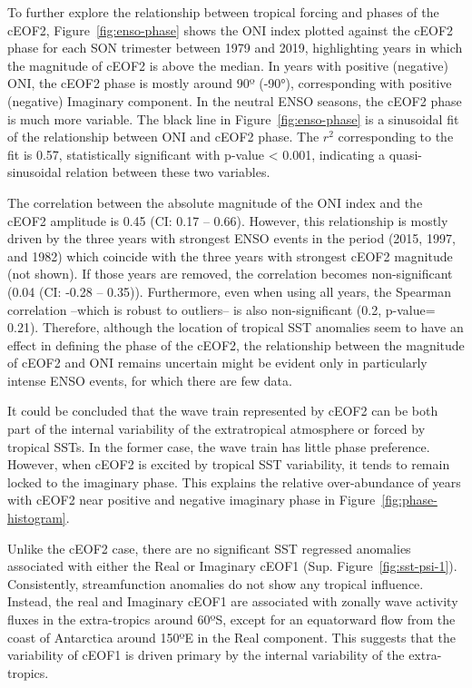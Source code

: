 \documentclass[smallextended]{svjour3}       %
\begin{document}
To further explore the relationship between tropical forcing and phases of the cEOF2, Figure~\ref{fig:enso-phase} shows the ONI index plotted against the cEOF2 phase for each SON trimester between 1979 and 2019, highlighting years in which the magnitude of cEOF2 is above the median.
In years with positive (negative) ONI, the cEOF2 phase is mostly around 90º (-90°), corresponding with positive (negative) Imaginary component.
In the neutral ENSO seasons, the cEOF2 phase is much more variable.
The black line in Figure~\ref{fig:enso-phase} is a sinusoidal fit of the relationship between ONI and cEOF2 phase.
The \(r^2\) corresponding to the fit is 0.57, statistically significant with p-value \textless{} 0.001, indicating a quasi-sinusoidal relation between these two variables.

The correlation between the absolute magnitude of the ONI index and the cEOF2 amplitude is 0.45 (CI: 0.17 -- 0.66).
However, this relationship is mostly driven by the three years with strongest ENSO events in the period (2015, 1997, and 1982) which coincide with the three years with strongest cEOF2 magnitude (not shown).
If those years are removed, the correlation becomes non-significant (0.04 (CI: -0.28 -- 0.35)).
Furthermore, even when using all years, the Spearman correlation --which is robust to outliers-- is also non-significant (0.2, p-value= 0.21).
Therefore, although the location of tropical SST anomalies seem to have an effect in defining the phase of the cEOF2, the relationship between the magnitude of cEOF2 and ONI remains uncertain might be evident only in particularly intense ENSO events, for which there are few data.

It could be concluded that the wave train represented by cEOF2 can be both part of the internal variability of the extratropical atmosphere or forced by tropical SSTs.
In the former case, the wave train has little phase preference.
However, when cEOF2 is excited by tropical SST variability, it tends to remain locked to the imaginary phase.
This explains the relative over-abundance of years with cEOF2 near positive and negative imaginary phase in Figure~\ref{fig:phase-histogram}.

Unlike the cEOF2 case, there are no significant SST regressed anomalies associated with either the Real or Imaginary cEOF1 (Sup. Figure~\ref{fig:sst-psi-1}).
Consistently, streamfunction anomalies do not show any tropical influence.
Instead, the real and Imaginary cEOF1 are associated with zonally wave activity fluxes in the extra-tropics around 60ºS, except for an equatorward flow from the coast of Antarctica around 150ºE in the Real component.
This suggests that the variability of cEOF1 is driven primary by the internal variability of the extra-tropics.
\end{document}
